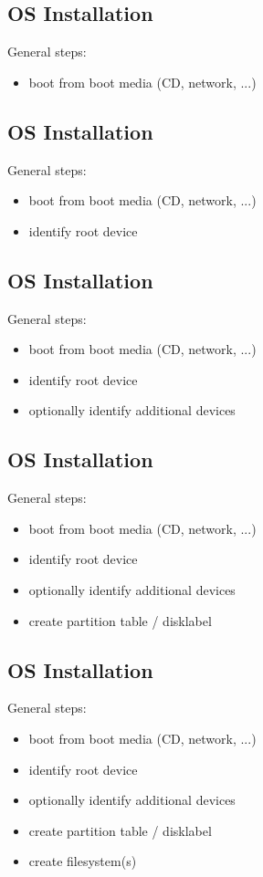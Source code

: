 \documentclass[xga]{xdvislides}
\begin{document}
\subsection{OS Installation}
General steps:
\begin{itemize}
	\item boot from boot media (CD, network, ...)
\end{itemize}

\subsection{OS Installation}
General steps:
\begin{itemize}
	\item boot from boot media (CD, network, ...)
	\item identify root device
\end{itemize}

\subsection{OS Installation}
General steps:
\begin{itemize}
	\item boot from boot media (CD, network, ...)
	\item identify root device
	\item optionally identify additional devices
\end{itemize}

\subsection{OS Installation}
General steps:
\begin{itemize}
	\item boot from boot media (CD, network, ...)
	\item identify root device
	\item optionally identify additional devices
	\item create partition table / disklabel
\end{itemize}

\subsection{OS Installation}
General steps:
\begin{itemize}
	\item boot from boot media (CD, network, ...)
	\item identify root device
	\item optionally identify additional devices
	\item create partition table / disklabel
	\item create filesystem(s)
\end{itemize}
\end{document}

